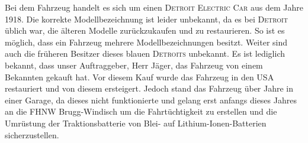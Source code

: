 Bei dem Fahrzeug handelt es sich um einen \textsc{Detroit Electric Car} aus dem Jahre 1918. Die korrekte Modellbezeichnung ist leider unbekannt, da es bei \textsc{Detroit} üblich war, die älteren Modelle zurückzukaufen und zu restaurieren. So ist es möglich, dass ein Fahrzeug mehrere Modellbezeichnungen besitzt. Weiter sind auch die früheren Besitzer dieses blauen \textsc{Detroits} unbekannt. Es ist lediglich bekannt, dass unser Auftraggeber, Herr Jäger, das Fahrzeug von einem Bekannten gekauft hat. Vor diesem Kauf wurde das Fahrzeug in den USA restauriert und von diesem ersteigert. Jedoch stand das Fahrzeug über Jahre in einer Garage, da dieses nicht funktionierte und gelang erst anfangs dieses Jahres an die FHNW Brugg-Windisch um die Fahrtüchtigkeit zu erstellen und die Umrüstung der Traktionsbatterie von Blei- auf Lithium-Ionen-Batterien sicherzustellen.

\newpage